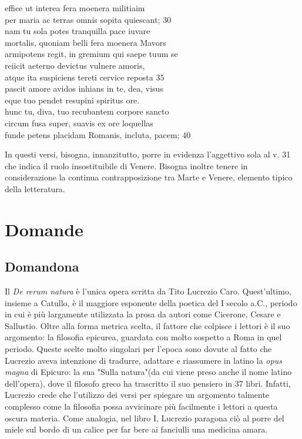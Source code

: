 \documentclass[10pt,a4paper]{article}
\begin{document}
		\begin{estratto}
			effice ut interea fera moenera militiaim\\
			per maria ac terras omnis sopita quiescant;               30\\
			nam tu sola potes tranquilla pace iuvare\\
			mortalis, quoniam belli fera moenera Mavors\\
			armipotens regit, in gremium qui saepe tuum se\\
			reiicit aeterno devictus vulnere amoris,\\
			atque ita suspiciens tereti cervice reposta               35\\
			pascit amore avidos inhians in te, dea, visus\\
			eque tuo pendet resupini spiritus ore.\\
			hunc tu, diva, tuo recubantem corpore sancto\\
			circum fusa super, suavis ex ore loquellas\\
			funde petens placidam Romanis, incluta, pacem;               40\\
		\end{estratto}
	
	In questi versi, bisogna, innanzitutto, porre in evidenza l'aggettivo sola al v. 31 che indica il ruolo insostituibile di Venere. Bisogna inoltre tenere in considerazione la continua contrapposizione tra Marte e Venere, elemento tipico della letteratura.
	
	\section{Domande}
	
	\subsection{Domandona}
	
	Il \textit{De rerum natura} è l'unica opera scritta da Tito Lucrezio Caro. Quest'ultimo, insieme a Catullo, è il maggiore esponente della poetica del I secolo a.C., periodo in cui è più largamente utilizzata la prosa da autori come Cicerone, Cesare e Sallustio. Oltre alla forma metrica scelta, il fattore che colpisce i lettori è il suo argomento: la filosofia epicurea, guardata con molto sospetto a Roma in quel periodo. Queste scelte molto singolari per l'epoca sono dovute al fatto che Lucrezio aveva intenzione di tradurre, adattare e riassumere in latino la \textit{opus magna} di Epicuro: la sua "Sulla natura"(da cui viene preso anche il nome latino dell'opera), dove il filosofo greco ha trascritto il suo pensiero in 37 libri. Infatti, Lucrezio crede che l'utilizzo dei versi per spiegare un argomento talmente complesso come la filosofia possa avvicinare più facilmente i lettori a questa oscura materia. Come analogia, nel libro I, Lucrezio paragona ciò al porre del miele sul bordo di un calice per far bere ai fanciulli una medicina amara.
	
\end{document}
